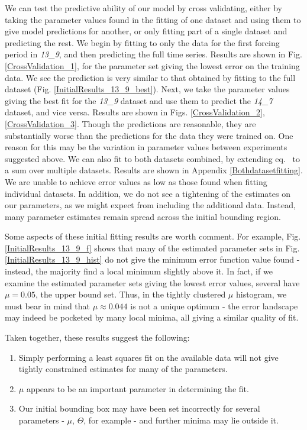 \documentclass[10pt,journal]{./IEEE_latex_class/IEEEtran}
\renewcommand{\eqref}{eq.~\originaleqref}
\begin{document}
  We can test the predictive ability of our model by cross validating, either by taking the parameter values found in the fitting of one dataset and using them to give model predictions for another, or only fitting part of a single dataset and predicting the rest.  We begin by fitting to only the data for the first forcing period in \textit{13\_9}, and then predicting the full time series. Results are shown in Fig. \ref{CrossValidation_1}, for the parameter set giving the lowest error on the training data. We see the prediction is very similar to that obtained by fitting to the full dataset (Fig. \ref{InitialResults_13_9_best}). Next, we take the parameter values giving the best fit for the  \textit{13\_9} dataset and use them to predict the \textit{14\_7} dataset, and vice versa. Results are shown in Figs. \ref{CrossValidation_2}, \ref{CrossValidation_3}.
Though the predictions are reasonable, they are substantially worse than the predictions for the data they were trained on. One reason for this may be the variation in parameter values between experiments suggested above. We can also fit to both datasets combined, by extending \eqref{eq:min} to a sum over multiple datasets. Results are shown in Appendix \ref{Bothdatasetfitting}. We are unable to achieve error values as low as those found when fitting individual datasets. In addition, we do not see a tightening of the estimates on our parameters, as we might expect from including the additional data. Instead, many parameter estimates remain spread across the initial bounding region. 
 
Some aspects of these initial fitting results are worth comment. For example, Fig. \ref{InitialResults_13_9_f} shows that many of the estimated parameter sets in Fig. \ref{InitialResults_13_9_hist} do not give the minimum error function value found - instead, the majority find a local minimum slightly above it. In fact, if we examine the estimated parameter sets giving the lowest error values, several have $\mu = 0.05$, the upper bound set. Thus, in the tightly clustered $\mu$ histogram, we must bear in mind that $\mu \approx 0.044$ is not a unique optimum - the error landscape may indeed be pocketed by many local minima, all giving a similar quality of fit.

Taken together, these results suggest the following:


\begin{enumerate}
\item Simply performing a least squares fit on the available data will not give tightly constrained estimates for many of the parameters.
\item $\mu$ appears to be an important parameter in determining the fit.
\item Our initial bounding box may have been set incorrectly for several parameters - $\mu$, $\Theta$, for example - and further minima may lie outside it. 
\end{enumerate}
\end{document}
